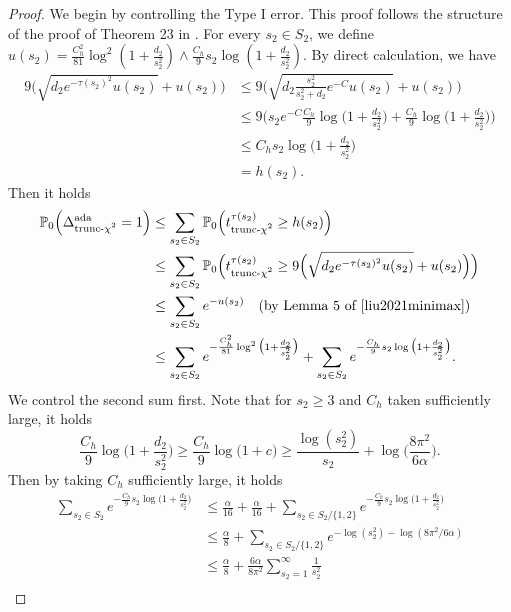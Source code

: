 \documentclass{article}
\newcommand{\bbP}{\mathbb{P}}
\newcommand{\chisqlin}{\text{trunc-$\chi^2$}}
\theoremstyle{remark}
\begin{document}
\begin{proof}

 We begin by controlling the Type I error. This proof follows the structure of the proof of Theorem 23 in \cite{kotekal2023minimax}. For every $s_2 \in S_2$, we define $u(s_2) = \frac{C^2_h}{81}\log^2(1 + \frac{d_2}{s_2^2}) \land \frac{C_h}{9} s_2\log(1 + \frac{d_2}{s_2^2})$. By direct calculation, we have
\begin{align*}
    9\Big(\sqrt{d_2 e^{-\tau(s_2)^2}u(s_2)} + u(s_2)\Big) 
    &\leq  9\Big(\sqrt{d_2 \frac{s_2^2}{s_2^2 + d_2} e^{-C}u(s_2)} + u(s_2)\Big) \\
    &\leq 9\Big(s_2e^{-C}\frac{C_h}{9}\log\big(1 + \frac{d_2}{s_2^2}\big) + \frac{C_h}{9}\log\big(1 + \frac{d_2}{s_2^2}\big)\Big) \\
    &\leq C_h s_2 \log\big(1 + \frac{d_2}{s_2^2}\big) \\
    &= h(s_2).
\end{align*}
Then it holds
\begin{align*}
    \bbP_0\Big(\Delta^{\text{ada}}_{\chisqlin} = 1\Big) &\leq \sum_{s_2 \in S_2}\bbP_0\Big(t^{\tau(s_2)}_{\chisqlin} \geq h(s_2)\Big) \\
    &\leq \sum_{s_2 \in S_2}\bbP_0\Big(t^{\tau(s_2)}_{\chisqlin} \geq 9\Big(\sqrt{d_2 e^{-\tau(s_2)^2}u(s_2)} + u(s_2)\Big)\Big) \\
    &\leq \sum_{s_2 \in S_2}e^{-u(s_2)} \quad \text{(by Lemma 5 of \cite{liu2021minimax})} \\
    &\leq \sum_{s_2 \in S_2}e^{-\frac{C^2_h}{81}\log^2\big(1 + \frac{d_2}{s_2^2}\big)} + \sum_{s_2 \in S_2}e^{-\frac{C_h}{9}s_2 \log\big(1 + \frac{d_2}{s_2^2}\big)}.
\end{align*}
We control the second sum first. Note that for $s_2 \geq 3$ and $C_h$ taken sufficiently large, it holds
\[\frac{C_h}{9}\log\big(1 + \frac{d_2}{s_2^2}\big) \geq \frac{C_h}{9}\log\big(1 + c\big) \geq \frac{\log(s_2^2)}{s_2} + \log\big(\frac{8\pi^2}{6\alpha}\big).\]
Then by taking $C_h$ sufficiently large, it holds
\begin{align*}
    \sum_{s_2 \in S_2}e^{-\frac{C_h}{9}s_2 \log\big(1 + \frac{d_2}{s_2^2}\big)} &\leq \frac{\alpha}{16} + \frac{\alpha}{16} + \sum_{s_2 \in S_2 / \{1, 2\}}e^{-\frac{C_h}{9}s_2 \log\big(1 + \frac{d_2}{s_2^2}\big)} \\
    &\leq \frac{\alpha}{8} +  \sum_{s_2 \in S_2 / \{1, 2\}}e^{-\log(s_2^2) - \log(8\pi^2/6\alpha)} \\
    &\leq \frac{\alpha}{8} + \frac{6\alpha}{8\pi^2}\sum_{s_2 = 1}^{\infty}\frac{1}{s_2^2} \\

\end{align*}
\end{proof}
\end{document}
